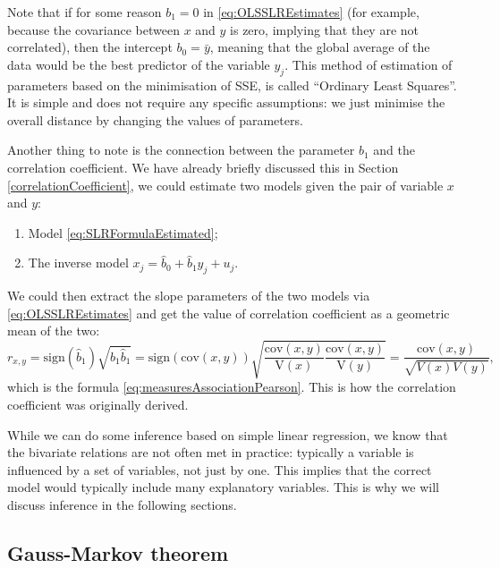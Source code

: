 \documentclass[
]{book}
\providecommand{\tightlist}{%
  \setlength{\itemsep}{0pt}\setlength{\parskip}{0pt}}
\theoremstyle{definition}
\theoremstyle{definition}
\theoremstyle{definition}
\theoremstyle{definition}
\theoremstyle{remark}
\begin{document}
Note that if for some reason \({b}_1=0\) in \eqref{eq:OLSSLREstimates} (for example, because the covariance between \(x\) and \(y\) is zero, implying that they are not correlated), then the intercept \({b}_0 = \bar{y}\), meaning that the global average of the data would be the best predictor of the variable \(y_j\). This method of estimation of parameters based on the minimisation of SSE, is called ``Ordinary Least Squares''. It is simple and does not require any specific assumptions: we just minimise the overall distance by changing the values of parameters.

Another thing to note is the connection between the parameter \({b}_1\) and the correlation coefficient. We have already briefly discussed this in Section \ref{correlationCoefficient}, we could estimate two models given the pair of variable \(x\) and \(y\):

\begin{enumerate}
\def\labelenumi{\arabic{enumi}.}
\tightlist
\item
  Model \eqref{eq:SLRFormulaEstimated};
\item
  The inverse model \(x_j = \hat{b}_0 + \hat{b}_1 y_j + u_j\).
\end{enumerate}

We could then extract the slope parameters of the two models via \eqref{eq:OLSSLREstimates} and get the value of correlation coefficient as a geometric mean of the two:
\begin{equation}
    r_{x,y} = \mathrm{sign}(\hat{b}_1) \sqrt{{b}_1 \hat{b}_1} = \mathrm{sign}(\mathrm{cov}(x,y)) \sqrt{\frac{\mathrm{cov}(x,y)}{\mathrm{V}(x)} \frac{\mathrm{cov}(x,y)}{\mathrm{V}(y)}} = \frac{\mathrm{cov}(x,y)}{\sqrt{V(x)V(y)}} ,
    \label{eq:correlationDerivationPearson}
\end{equation}
which is the formula \eqref{eq:measuresAssociationPearson}. This is how the correlation coefficient was originally derived.

While we can do some inference based on simple linear regression, we know that the bivariate relations are not often met in practice: typically a variable is influenced by a set of variables, not just by one. This implies that the correct model would typically include many explanatory variables. This is why we will discuss inference in the following sections.

\hypertarget{GaussMarkov}{%
\subsection{Gauss-Markov theorem}\label{GaussMarkov}}
\end{document}
